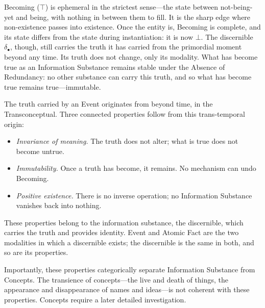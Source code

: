 Becoming ($\top$) is ephemeral in the strictest sense---the state between
not-being-yet and being, with nothing in between them to fill. It is the
sharp edge where non-existence passes into existence. Once the entity is,
Becoming is complete, and its state differs from the state during
instantiation: it is now $\bot$. The discernible $\delta_\bullet$, though,
still carries the truth it has carried from the primordial moment beyond any
time. Its truth does not change, only its modality. What has become true as
an Information Substance remains stable under the Absence of Redundancy: no
other substance can carry this truth, and so what has become true remains
true---immutable.

The truth carried by an Event originates from beyond time, in the
Transconceptual. Three connected properties follow from this trans-temporal
origin:

\begin{itemize}
    \item \textit{Invariance of meaning.} The truth does not alter; what is
    true does not become untrue.
    \item \textit{Immutability.} Once a truth has become, it remains. No
    mechanism can undo Becoming.
    \item \textit{Positive existence.} There is no inverse operation; no
    Information Substance vanishes back into nothing.
\end{itemize}

These properties belong to the information substance, the discernible, which
carries the truth and provides identity. Event and Atomic Fact are the two
modalities in which a discernible exists; the discernible is the same in both,
and so are its properties.

Importantly, these properties categorically separate Information Substance from
Concepts. The transience of concepts---the live and death of things, the
appearance and disappearance of names and ideas---is not coherent with these
properties. Concepts require a later detailed investigation.


